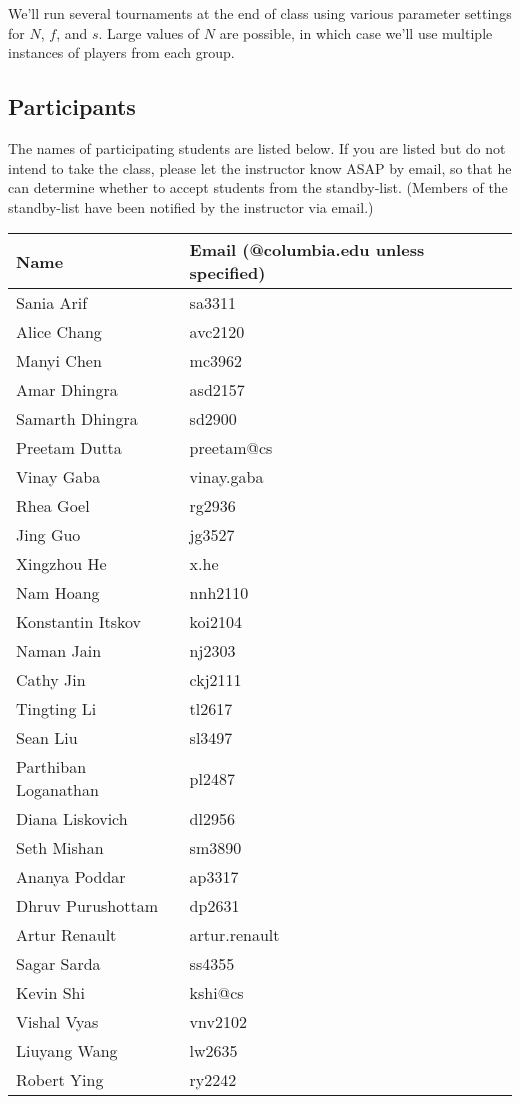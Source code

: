 We'll run several tournaments at the end of class using various
parameter settings for $N$, $f$, and $s$. Large values of $N$ are
possible, in which case we'll use multiple instances of players from
each group.

\subsection{Participants}

The names of participating students are listed below.  If you are listed but do not intend to
take the class, please let the instructor know ASAP by email, so that
he can determine whether to accept students from the standby-list.
(Members of the standby-list have been notified by the instructor via email.)

\begin{tabular}{ll}
Name & Email (@columbia.edu unless specified) \\ \hline
Sania Arif & sa3311 \\
Alice Chang & avc2120 \\
Manyi Chen & mc3962 \\
Amar Dhingra & asd2157 \\
Samarth Dhingra & sd2900 \\
Preetam Dutta & preetam@cs \\
Vinay Gaba & vinay.gaba \\
Rhea Goel & rg2936 \\
Jing Guo & jg3527 \\
Xingzhou He & x.he \\
Nam Hoang & nnh2110 \\
Konstantin Itskov & koi2104 \\
Naman Jain & nj2303 \\
Cathy Jin & ckj2111 \\
Tingting Li & tl2617 \\
Sean Liu & sl3497 \\
Parthiban Loganathan & pl2487 \\
Diana Liskovich & dl2956 \\
Seth Mishan & sm3890 \\
Ananya Poddar & ap3317 \\
Dhruv Purushottam & dp2631 \\
Artur Renault & artur.renault \\
Sagar Sarda & ss4355 \\
Kevin Shi & kshi@cs \\
Vishal Vyas & vnv2102 \\
Liuyang Wang & lw2635 \\
Robert Ying & ry2242 \\
\end{tabular}
